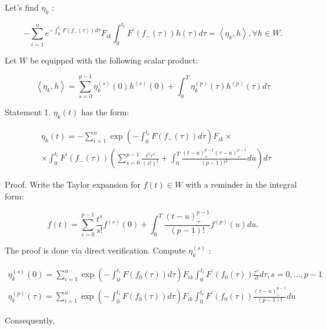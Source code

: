 \documentclass[10pt]{article}
\begin{document}
Let's find $\eta_{k}$ :


\begin{equation*}
-\sum_{i=1}^{n} e^{-\int_{0}^{t_{i}} F\left(f_{-}(\tau)\right) d \tau} F_{i k} \int_{0}^{t_{i}} F^{\prime}\left(f_{-}(\tau)\right) h(\tau) d \tau=\left\langle\eta_{k}, h\right\rangle, \forall h \in W . \tag{23}
\end{equation*}


Let $W$ be equipped with the following scalar product:

$$
\left\langle\eta_{k}, h\right\rangle=\sum_{s=0}^{p-1} \eta_{k}^{(s)}(0) h^{(s)}(0)+\int_{0}^{T} \eta_{k}^{(p)}(\tau) h^{(p)}(\tau) d \tau
$$

Statement 1. $\eta_{k}(t)$ has the form:


\begin{align*}
& \eta_{k}(t)=-\sum_{i=1}^{n} \exp \left(-\int_{0}^{t_{i}} F\left(f_{-}(\tau)\right) d \tau\right) F_{i k} \times \\
& \times \int_{0}^{t_{i}} F^{\prime}\left(f_{-}(\tau)\right)\left(\sum_{s=0}^{p-1} \frac{t^{s} \tau^{s}}{(s!)^{2}}+\int_{0}^{T} \frac{(t-u)_{+}^{p-1}(\tau-u)_{+}^{p-1}}{(p-1)!^{2}} d u\right) d \tau \tag{24}
\end{align*}


Proof. Write the Taylor expansion for $f(t) \in W$ with a reminder in the integral form:


\begin{equation*}
f(t)=\sum_{s=0}^{p-1} \frac{t^{s}}{s!} f^{(s)}(0)+\int_{0}^{T} \frac{(t-u)_{+}^{p-1}}{(p-1)!} f^{(p)}(u) d u . \tag{25}
\end{equation*}


The proof is done via direct verification. Compute $\eta_{k}^{(s)}$ :

$$
\begin{gathered}
\eta_{k}^{(s)}(0)=\sum_{i=1}^{n} \exp \left(-\int_{0}^{t_{i}} F\left(f_{0}(\tau)\right) d \tau\right) F_{i k} \int_{0}^{t_{i}} F^{\prime}\left(f_{0}(\tau)\right) \frac{\tau^{s}}{s!} d \tau, s=0, \ldots, p-1 \\
\eta_{k}^{(p)}(\tau)=\sum_{i=1}^{n} \exp \left(-\int_{0}^{t_{i}} F\left(f_{0}(\tau)\right) d \tau\right) F_{i k} \int_{0}^{t_{i}} F^{\prime}\left(f_{0}(\tau)\right) \frac{(\tau-u)_{+}^{p-1}}{(p-1)!} d u
\end{gathered}
$$

Consequently,
\end{document}
